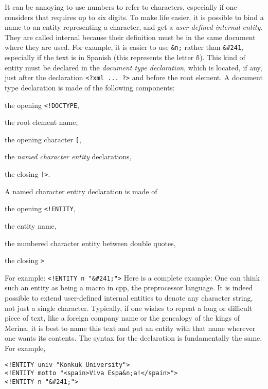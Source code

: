 It can be annoying to use numbers to refer to characters, especially
if one considers that \Unicode requires up to six digits. To make life
easier, it is possible to bind a name to an entity representing a
character, and get a \emph{user\hyp{}defined internal entity}. They
are called internal because their definition must be in the same
document where they are used. For example, it is easier to use
\verb|&n;| rather than \verb|&#241|, especially if the text is in
Spanish (this represents the letter \texttt{\~{n}}). This kind of
entity must be declared in the \emph{document type declaration}, which
is located, if any, just after the declaration \verb|<?xml ... ?>| and
before the root element.
\label{xml_intro:DOCTYPE} A document type declaration is made of the
following components:
\begin{enumerate*}

  \item the opening \verb|<!DOCTYPE|,

  \item the root element name,

  \item the opening character \verb|[|,

  \item the \emph{named character entity} declarations,

  \item the closing \verb|]>|.

\end{enumerate*}
A named character entity declaration is made of
\begin{enumerate*}

  \item the opening \verb|<!ENTITY|,

  \item the entity name,

  \item the numbered character entity between double quotes,

  \item the closing \verb|>|

\end{enumerate*}
For example: \verb|<!ENTITY n "&#241;">|
Here is a complete example:
\noindent One can think such an entity as being a macro in
\textsf{cpp}, the \Clang preprocessor language. It is indeed possible
to extend user\hyp{}defined internal entities to denote any character
string, not just a single character. Typically, if one wishes to
repeat a long or difficult piece of text, like a foreign company name
or the genealogy of the kings of Merina, it is best to name this text
and put an entity with that name wherever one wants its contents. The
syntax for the declaration is fundamentally the same. For example,
\begin{verbatim}
<!ENTITY univ "Konkuk University">
<!ENTITY motto "<spain>Viva Espa&n;a!</spain>">
<!ENTITY n "&#241;">
\end{verbatim}

